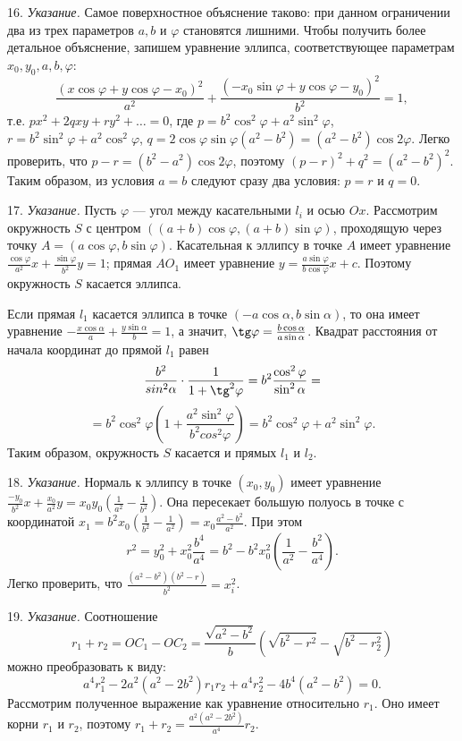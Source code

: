 16. \textit{Указание.} Самое поверхностное объяснение таково: при данном ограничении два из трех параметров $a, b$ и $\varphi$ становятся лишними. Чтобы получить более детальное объяснение, запишем уравнение эллипса, соответствующее параметрам $x_0, y_0, a, b, \varphi$:
\[
\frac{(x \cos \varphi + y \cos \varphi - x_0)^2}{a^2} + \frac{(-x_0 \sin \varphi + y \cos \varphi - y_0)^2}{b^2} = 1, 
\]
т.е. $px^2 + 2qxy + ry^2 + \dots = 0$, где $p = b^2 \cos^2 \varphi + a^2 \sin^2 \varphi$, $r = b^2 \sin^2 \varphi + a^2 \cos^2 \varphi$, $q = 2\cos\varphi\sin\varphi (a^2 - b^2) = (a^2 - b^2)\cos2\varphi$. Легко проверить, что $p - r = (b^2 - a^2) \cos 2\varphi$, поэтому $(p-r)^2 + q^2 = (a^2-b^2)^2$. Таким образом, из условия $a=b$ следуют сразу два условия: $p=r$ и $q=0$.

17. \textit{Указание.} Пусть $\varphi$ — угол между касательными $l_i$ и осью $Ox$. Рассмотрим окружность $S$ с центром $((a+b)\cos\varphi, (a+b)\sin\varphi)$, проходящую через точку $A = (a\cos\varphi, b\sin\varphi)$. Касательная к эллипсу в точке $A$ имеет уравнение $\frac{ \cos\varphi}{a^2}x + \frac{\sin\varphi}{b^2}y = 1$; прямая $AO_1$ имеет уравнение $y = \frac{a \sin\varphi}{b \cos\varphi} x + c$. Поэтому окружность $S$ касается эллипса. 

Если прямая $l_1$ касается эллипса в точке $(-a \cos\alpha, b \sin\alpha)$, то она имеет уравнение $-\frac{x \cos\alpha}{a} + \frac{y \sin\alpha}{b} = 1$, а значит, $\tg \varphi = \frac{b \cos\alpha}{a \sin\alpha}$. Квадрат расстояния от начала координат до прямой $l_1$ равен 
\[
	\frac{b^2}{sin^2 \alpha} \cdot \frac{1}{1 + \tg^2 \varphi} = b^2 \frac{\cos^2 \varphi}{\sin^2 \alpha} =
\]
\[
	= b^2 \cos^2 \varphi \left(1 + \frac{a^2 \sin^2 \varphi}{b^2cos^2 \varphi}\right) = b^2 \cos^2\varphi + a^2 \sin^2\varphi.
\]
Таким образом, окружность $S$ касается и прямых $l_1$ и $l_2$.

18. \textit{Указание.} Нормаль к эллипсу в точке $(x_0, y_0)$ имеет уравнение $\frac{-y_0}{b^2}x + \frac{x_0}{a^2}y = x_0 y_0 \left(\frac{1}{a^2} - \frac{1}{b^2}\right)$. Она пересекает большую полуось в точке с координатой $x_1 = b^2 x_0 \left(\frac{1}{b^2} - \frac{1}{a^2}\right) = x_0 \frac{a^2 - b^2}{a^2}$. При этом
\[
	r^2 = y_0^2 + x_0^2 \frac{b^4}{a^4} = b^2 - b^2 x_0^2\left(\frac{1}{a^2} - \frac{b^2}{a^4}\right).	
\]
Легко проверить, что $\frac{(a^2 - b^2)(b^2 - r)}{b^2} = x_i^2$.

19. \textit{Указание.} Соотношение
\[
	r_1 + r_2 = OC_1 - OC_2 = \frac{\sqrt{a^2 - b^2}}{b}(\sqrt{b^2 - r^2}- \sqrt{b^2 -r_2^2})
\]
можно преобразовать к виду:
\[
	a^4 r_1^2 - 2a^2(a^2 - 2b^2)r_1 r_2 + a^4 r_2^2 - 4b^4(a^2 - b^2) = 0. 
\]
Рассмотрим полученное выражение как уравнение относительно $r_1$. Оно имеет корни $r_1$ и $r_2$, поэтому $r_1 + r_2 = \frac{a^2(a^2 - 2b^2)}{a^4} r_2$.

